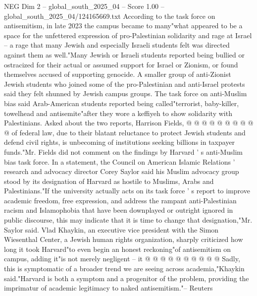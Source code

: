 \begin{textsample}{NEG Dim 2 – global\_south\_2025\_04 – Score 1.00 – global\_south\_2025\_04/124165669.txt}
According to the task force on antisemitism, in late 2023 the campus became to many"what appeared to be a space for the unfettered expression of pro-Palestinian solidarity and rage at Israel -- a rage that many Jewish and especially Israeli students felt was directed against them as well."Many Jewish or Israeli students reported being bullied or ostracized for their actual or assumed support for Israel or Zionism, or found themselves accused of supporting genocide.
A smaller group of anti-Zionist Jewish students who joined some of the pro-Palestinian and anti-Israel protests said they felt shunned by Jewish campus groups.
The task force on anti-Muslim bias said Arab-American students reported being called"terrorist, baby-killer, towelhead and antisemite"after they wore a keffiyeh to show solidarity with Palestinians.
Asked about the two reports, Harrison Fields, @ @ @ @ @ @ @ @ @ @ of federal law, due to their blatant reluctance to protect Jewish students and defend civil rights, is unbecoming of institutions seeking billions in taxpayer funds."Mr.
Fields did not comment on the findings by Harvard ' s anti-Muslim bias task force.
In a statement, the Council on American Islamic Relations ' research and advocacy director Corey Saylor said his Muslim advocacy group stood by its designation of Harvard as hostile to Muslims, Arabs and Palestinians."If the university actually acts on its task force ' s report to improve academic freedom, free expression, and address the rampant anti-Palestinian racism and Islamophobia that have been downplayed or outright ignored in public discourse, this may indicate that it is time to change that designation,"Mr.
Saylor said.
Vlad Khaykin, an executive vice president with the Simon Wiesenthal Center, a Jewish human rights organization, sharply criticized how long it took Harvard"to even begin an honest reckoning"of antisemitism on campus, adding it"is not merely negligent -- it @ @ @ @ @ @ @ @ @ @ Sadly, this is symptomatic of a broader trend we are seeing across academia,"Khaykin said."Harvard is both a symptom and a progenitor of the problem, providing the imprimatur of academic legitimacy to naked antisemitism."-- Reuters

\end{textsample}
